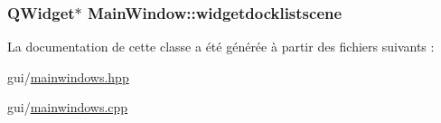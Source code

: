 \hypertarget{class_main_window_a38d553a96a3898e65b500c639673b8de}{
\subsubsection[{widgetdocklistscene}]{\setlength{\rightskip}{0pt plus 5cm}Q\+Widget$\ast$ Main\+Window\+::widgetdocklistscene\hspace{0.3cm}{\ttfamily [private]}}}\label{class_main_window_a38d553a96a3898e65b500c639673b8de}


La documentation de cette classe a été générée à partir des fichiers suivants \+:\begin{DoxyCompactItemize}
\item 
gui/\hyperlink{mainwindows_8hpp}{mainwindows.\+hpp}\item 
gui/\hyperlink{mainwindows_8cpp}{mainwindows.\+cpp}\end{DoxyCompactItemize}
